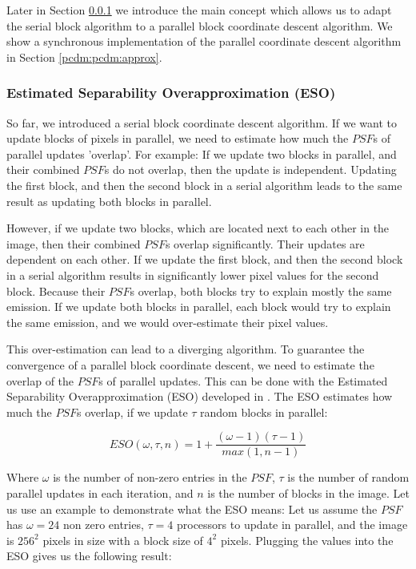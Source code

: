Later in Section \ref{pcdm:pcdm:eso} we introduce the main concept which allows us to adapt the serial block algorithm to a parallel block coordinate descent algorithm. We show a synchronous implementation of the parallel coordinate descent algorithm in Section \ref{pcdm:pcdm:approx}.



\subsubsection{Estimated Separability Overapproximation (ESO)} \label{pcdm:pcdm:eso}
So far, we introduced a serial block coordinate descent algorithm. If we want to update blocks of pixels in parallel, we need to estimate how much the $PSF$s of parallel updates 'overlap'. For example: If we update two blocks in parallel, and their combined $PSF$s do not overlap, then the update is independent. Updating the first block, and then the second block in a serial algorithm leads to the same result as updating both blocks in parallel. 

However, if we update two blocks, which are located next to each other in the image, then their combined $PSF$s overlap significantly. Their updates are dependent on each other. If we update the first block, and then the second block in a serial algorithm results in significantly lower pixel values for the second block. Because their $PSF$s overlap, both blocks try to explain mostly the same emission. If we update both blocks in parallel, each block would try to explain the same emission, and we would over-estimate their pixel values.

This over-estimation can lead to a diverging algorithm. To guarantee the convergence of a parallel block coordinate descent, we need to estimate the overlap of the $PSF$s of parallel updates. This can be done with the Estimated Separability Overapproximation (ESO) developed in \cite{richtarik2016parallel}. The ESO estimates how much the $PSF$s overlap, if we update $\tau$ random blocks in parallel:

\begin{equation}\label{pcdm:pcdm:eso}
ESO(\omega, \tau, n) = 1+ \frac{(\omega - 1)(\tau - 1)}{max(1, n -1)}
\end{equation}

Where $\omega$ is the number of non-zero entries in the $PSF$, $\tau$ is the number of random parallel updates in each iteration, and $n$ is the number of blocks in the image. Let us use an example to demonstrate what the ESO means: Let us assume the $PSF$ has $\omega = 24$ non zero entries, $\tau = 4$ processors to update in parallel, and the image is $256^2$ pixels in size with a block size of $4^2$ pixels. Plugging the values into the ESO gives us the following result:

